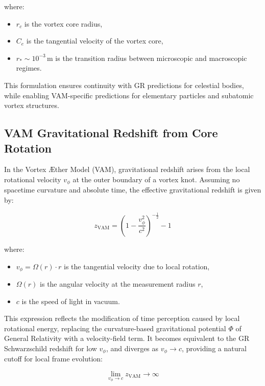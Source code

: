 where:
\begin{itemize}
    \item \( r_c \) is the vortex core radius,
    \item \( C_e \) is the tangential velocity of the vortex core,
    \item \( r_\ast \sim 10^{-3} \, \text{m} \) is the transition radius between microscopic and macroscopic regimes.
\end{itemize}

This formulation ensures continuity with GR predictions for celestial bodies, while enabling VAM-specific predictions for elementary particles and subatomic vortex structures.
\subsection*{VAM Gravitational Redshift from Core Rotation}

In the Vortex Æther Model (VAM), gravitational redshift arises from the local rotational velocity \( v_\phi \) at the outer boundary of a vortex knot. Assuming no spacetime curvature and absolute time, the effective gravitational redshift is given by:

\begin{equation}
    z_{\text{VAM}} =
    \left( 1 - \frac{v_\phi^2}{c^2} \right)^{-\frac{1}{2}} - 1
\end{equation}

where:
\begin{itemize}
    \item \( v_\phi = \Omega(r) \cdot r \) is the tangential velocity due to local rotation,
    \item \( \Omega(r) \) is the angular velocity at the measurement radius \( r \),
    \item \( c \) is the speed of light in vacuum.
\end{itemize}

This expression reflects the modification of time perception caused by local rotational energy, replacing the curvature-based gravitational potential \( \Phi \) of General Relativity with a velocity-field term. It becomes equivalent to the GR Schwarzschild redshift for low \( v_\phi \), and diverges as \( v_\phi \rightarrow c \), providing a natural cutoff for local frame evolution:

\begin{equation}
    \lim_{v_\phi \to c} z_{\text{VAM}} \to \infty
\end{equation}

